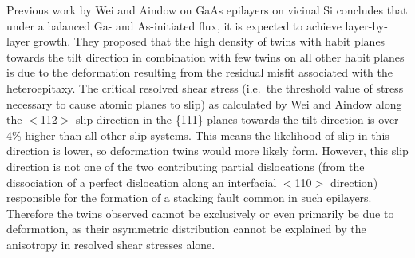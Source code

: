 Previous work by Wei and Aindow\cite{Wei1994} on GaAs epilayers on vicinal Si concludes that under a balanced Ga- and As-initiated flux, it is expected to achieve layer-by-layer growth. They proposed that the high density of twins with habit planes towards the tilt direction in combination with few twins on all other habit planes is due to the deformation resulting from the residual misfit associated with the heteroepitaxy. The critical resolved shear stress (i.e.\ the threshold value of stress necessary to cause atomic planes to slip) as calculated by Wei and Aindow\cite{Wei1994} along the $<$112$>$ slip direction in the \{111\} planes towards the tilt direction is over 4\% higher than all other slip systems. This means the likelihood of slip in this direction is lower, so deformation twins would more likely form. However, this slip direction is not one of the two contributing partial dislocations (from the dissociation of a perfect dislocation along an interfacial $<$110$>$ direction) responsible for the formation of a stacking fault common in such epilayers. Therefore the twins observed cannot be exclusively or even primarily be due to deformation, as their asymmetric distribution cannot be explained by the anisotropy in resolved shear stresses alone.

